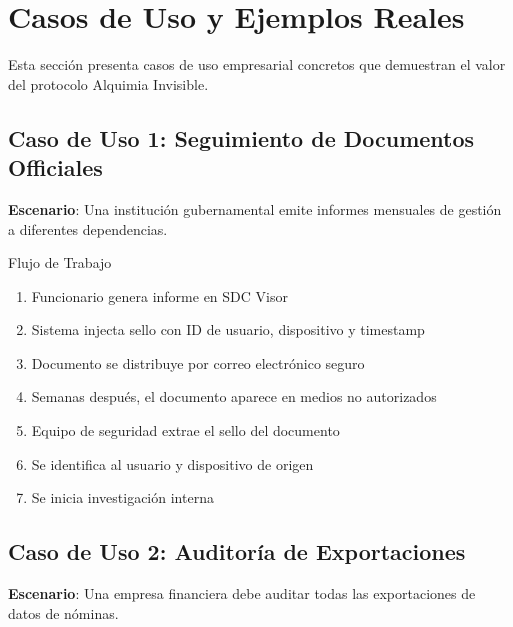 
\section{Casos de Uso y Ejemplos Reales}
\label{sec:ai-casos}

Esta sección presenta casos de uso empresarial concretos que demuestran el valor del protocolo Alquimia Invisible.

\subsection{Caso de Uso 1: Seguimiento de Documentos Officiales}

\textbf{Escenario}: Una institución gubernamental emite informes mensuales de gestión a diferentes dependencias.

\begin{caja}{Flujo de Trabajo}
\begin{enumerate}
\item Funcionario genera informe en SDC Visor
\item Sistema injecta sello con ID de usuario, dispositivo y timestamp
\item Documento se distribuye por correo electrónico seguro
\item Semanas después, el documento aparece en medios no autorizados
\item Equipo de seguridad extrae el sello del documento
\item Se identifica al usuario y dispositivo de origen
\item Se inicia investigación interna
\end{enumerate}
\end{caja}


\subsection{Caso de Uso 2: Auditoría de Exportaciones}

\textbf{Escenario}: Una empresa financiera debe auditar todas las exportaciones de datos de nóminas.

